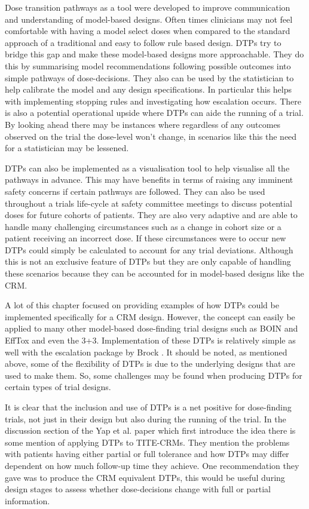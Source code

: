 Dose transition pathways as a tool were developed to improve communication and understanding of model-based designs. Often times clinicians may not feel comfortable with having a model select doses when compared to the standard approach of a traditional and easy to follow rule based design. DTPs try to bridge this gap and make these model-based designs more approachable. They do this by summarising model recommendations following possible outcomes into simple pathways of dose-decisions. They also can be used by the statistician to help calibrate the model and any design specifications. In particular this helps with implementing stopping rules and investigating how escalation occurs. There is also a potential operational upside where DTPs can aide the running of a trial. By looking ahead there may be instances where regardless of any outcomes observed on the trial the dose-level won't change, in scenarios like this the need for a statistician may be lessened. 

DTPs can also be implemented as a visualisation tool to help visualise all the pathways in advance. This may have benefits in terms of raising any imminent safety concerns if certain pathways are followed. They can also be used throughout a trials life-cycle at safety committee meetings to discuss potential doses for future cohorts of patients. They are also very adaptive and are able to handle many challenging circumstances such as a change in cohort size or a patient receiving an incorrect dose. If these circumstances were to occur new DTPs could simply be calculated to account for any trial deviations. Although this is not an exclusive feature of DTPs but they are only capable of handling these scenarios because they can be accounted for in model-based designs like the CRM. 

A lot of this chapter focused on providing examples of how DTPs could be implemented specifically for a CRM design. However, the concept can easily be applied to many other model-based dose-finding trial designs such as BOIN and EffTox and even the 3+3. Implementation of these DTPs is relatively simple as well with the escalation package by Brock \cite{brockModularApproachDose2020}. It should be noted, as mentioned above, some of the flexibility of DTPs is due to the underlying designs that are used to make them. So, some challenges may be found when producing DTPs for certain types of trial designs. 

It is clear that the inclusion and use of DTPs is a net positive for dose-finding trials, not just in their design but also during the running of the trial. In the discussion section of the Yap et al. \cite{yapDoseTransitionPathways2017} paper which first introduce the idea there is some mention of applying DTPs to TITE-CRMs. They mention the problems with patients having either partial or full tolerance and how DTPs may differ dependent on how much follow-up time they achieve. One recommendation they gave was to produce the CRM equivalent DTPs, this would be useful during design stages to assess whether dose-decisions change with full or partial information. 

